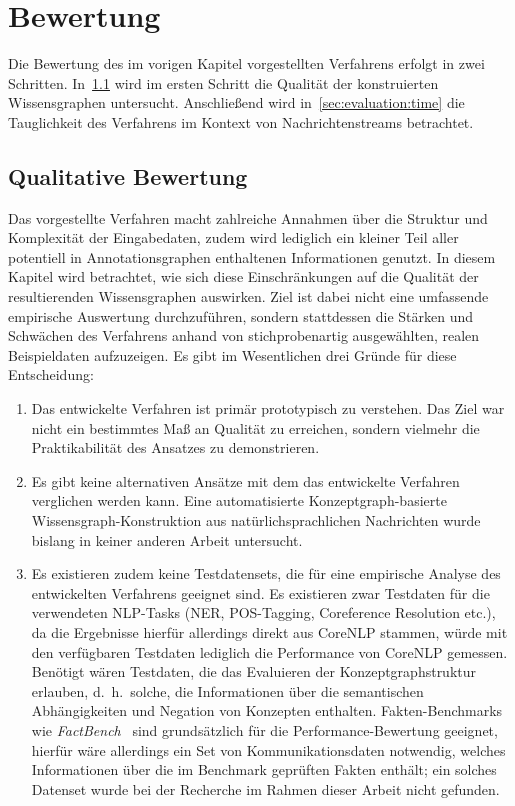 \chapter{Bewertung}%
\label{sec:evaluation}

Die Bewertung des im vorigen Kapitel vorgestellten Verfahrens erfolgt in zwei Schritten.
In~\ref{sec:evaluation:quality} wird im ersten Schritt die Qualität der konstruierten Wissensgraphen untersucht.
Anschließend wird in~\ref{sec:evaluation:time} die Tauglichkeit des Verfahrens im Kontext von Nachrichtenstreams betrachtet.

\section{Qualitative Bewertung}%
\label{sec:evaluation:quality}

Das vorgestellte Verfahren macht zahlreiche Annahmen über die Struktur und Komplexität der Eingabedaten, zudem wird lediglich ein kleiner Teil aller potentiell in Annotationsgraphen enthaltenen Informationen genutzt.
In diesem Kapitel wird betrachtet, wie sich diese Einschränkungen auf die Qualität der resultierenden Wissensgraphen auswirken.
Ziel ist dabei nicht eine umfassende empirische Auswertung durchzuführen, sondern stattdessen die Stärken und Schwächen des Verfahrens anhand von stichprobenartig ausgewählten, realen Beispieldaten aufzuzeigen.
Es gibt im Wesentlichen drei Gründe für diese Entscheidung:
\begin{enumerate}
	\item Das entwickelte Verfahren ist primär prototypisch zu verstehen.
		Das Ziel war nicht ein bestimmtes Maß an Qualität zu erreichen, sondern vielmehr die Praktikabilität des Ansatzes zu demonstrieren.
	\item Es gibt keine alternativen Ansätze mit dem das entwickelte Verfahren verglichen werden kann.
		Eine automatisierte Konzeptgraph-basierte Wissensgraph-Konstruktion aus natürlichsprachlichen Nachrichten wurde bislang in keiner anderen Arbeit untersucht.
	\item Es existieren zudem keine Testdatensets, die für eine empirische Analyse des entwickelten Verfahrens geeignet sind.
		Es existieren zwar Testdaten für die verwendeten NLP-Tasks (NER, POS-Tagging, Coreference Resolution etc.), da die Ergebnisse hierfür allerdings direkt aus CoreNLP stammen, würde mit den verfügbaren Testdaten lediglich die Performance von CoreNLP gemessen.
		Benötigt wären Testdaten, die das Evaluieren der Konzept\-graph\-struktur erlauben, d.~h.\ solche, die Informationen über die semantischen Abhängigkeiten und Negation von Konzepten enthalten.
		Fakten-Benchmarks wie \textit{FactBench}~\cite{FactBench} sind grundsätzlich für die Performance-Bewertung geeignet, hierfür wäre allerdings ein Set von Kommunikationsdaten notwendig, welches Informationen über die im Benchmark geprüften Fakten enthält;
		ein solches Datenset wurde bei der Recherche im Rahmen dieser Arbeit nicht gefunden.
\end{enumerate}

